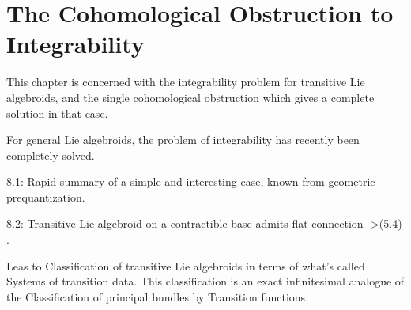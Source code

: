 \chapter{The Cohomological Obstruction to Integrability}

This chapter is concerned with the integrability problem for transitive Lie algebroids, and the single cohomological obstruction which gives a complete solution in that case.

\quad For general Lie algebroids, the problem of integrability has recently been completely solved.

8.1: Rapid summary of a simple and interesting case, known from geometric prequantization.

8.2: Transitive Lie algebroid on a contractible base admits flat connection ->(5.4) .

\quad Leas to Classification of transitive Lie algebroids in terms of what's called Systems of transition data. This classification is an exact infinitesimal analogue of the Classification of principal bundles by Transition functions.

\section{}

\section{}
